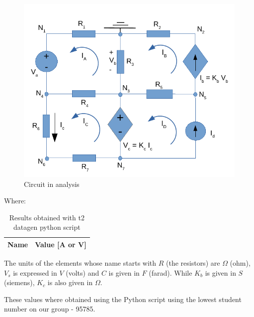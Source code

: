 \begin{figure}[H] \centering
\includegraphics[width=1\linewidth]{circuito.pdf}
\caption{Circuit in analysis}
\label{fig:circuito}
\end{figure}


\newpage

Where:
\begin{center}
\begin{table}[H]
 \centering
  \begin{tabular}{|c|c|}
    \hline    
    {\bf Name} & {\bf Value [A or V]} \\ \hline
    
  \end{tabular}
  \caption{Results obtained with t2 datagen python script}
  \label{tab:mesh}
\end{table}
\end{center}

The units of the elements whose name starts with $R$ (the resistors) are $\Omega$ (ohm), $V_s$ is expressed in $V$ (volts) and $C$ is given in $F$ (farad). While $K_b$ is given in $S$ (siemens), $K_c$ is also given in $\Omega$.

These values where obtained using the Python script using the lowest student number on our group - 95785.


